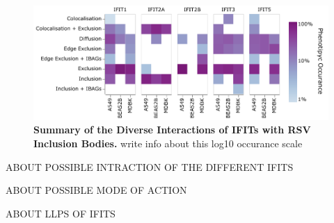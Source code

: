 \begin{figure}
    \centering
    \includegraphics[width=1\linewidth]{08. Chapter 3/Figs/heatmap_infection.pdf}
    \caption[Summary of the Diverse Interactions of IFITs with RSV Inclusion Bodies.]{\textbf{Summary of the Diverse Interactions of IFITs with RSV Inclusion Bodies.} write info about this log10 occurance scale}
    \label{fig:Summary of the Diverse Interactions of IFITs with RSV Inclusion Bodies}
\end{figure}

ABOUT POSSIBLE INTRACTION OF THE DIFFERENT IFITS

ABOUT POSSIBLE MODE OF ACTION

ABOUT LLPS OF IFITS
